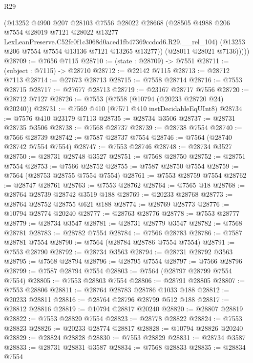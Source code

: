 \begin{lexlean}{R29}
\begin{coremodule}
            (@13252
              @4990
              @207
              @28103
              @7556
              @28022
              @28668
              (@28505
                @4988
                @206
                @7554
                @28019
                @7121
                @28022
                @13277
                LexLeanPreserve.C52fc0f1c3068d0aced1fb47369ccdcd6.R29.__rel_104)
              (@13253 @206 @7554 @7554 @13136 @7121 @13265 @13277))
            (@28011 @28021 @7136)))))
@28709 := @7656 @7115
@28710 := (state : @28709) -> @7551
@28711 := (subject : @7115) -> @28710
@28712 := @22142 @7115
@28713 := @28712 @7113
@28714 := @27673 @28713
@28715 := @7558 @28714
@28716 := @7553 @28715
@28717 := @27677 @28713
@28719 := @23167 @28717 @7556
@28720 := @28712 @7127
@28726 := @7553 (@7558 (@10794 (@20233 @28720 @24) @20240))
@28731 := @7569 @410 (@7571 @410 instDecidableEqUInt8)
@28734 := @7576 @410 @23179 @7113
@28735 := @28734 @3506
@28737 := @28731 @28735 @3506
@28738 := @7568 @28737
@28739 := @28738 @7554
@28740 := @7566 @28739
@28742 := @7587 @28737 @7554
@28746 := @7564 (@28740 @28742 @7554 @7554)
@28747 := @7553 @28746
@28748 := @28734 @3527
@28750 := @28731 @28748 @3527
@28751 := @7568 @28750
@28752 := @28751 @7554
@28753 := @7566 @28752
@28755 := @7587 @28750 @7554
@28759 := @7564 (@28753 @28755 @7554 @7554)
@28761 := @7553 @28759 @7554
@28762 := @28747 @28761
@28763 := @7553 @28762
@28764 := @7565 @18
@28768 := @28764 @28739 @28742 @3519 @188
@28769 := @20233 @28768
@28773 := @28764 @28752 @28755 @621 @188
@28774 := @28769 @28773
@28776 := @10794 @28774 @20240
@28777 := @28763 @28776
@28778 := @7553 @28777
@28779 := @28734 @3547
@28781 := @28731 @28779 @3547
@28782 := @7568 @28781
@28783 := @28782 @7554
@28784 := @7566 @28783
@28786 := @7587 @28781 @7554
@28790 := @7564 (@28784 @28786 @7554 @7554)
@28791 := @7553 @28790
@28792 := @28734 @3563
@28794 := @28731 @28792 @3563
@28795 := @7568 @28794
@28796 := @28795 @7554
@28797 := @7566 @28796
@28799 := @7587 @28794 @7554
@28803 := @7564 (@28797 @28799 @7554 @7554)
@28805 := @7553 @28803 @7554
@28806 := @28791 @28805
@28807 := @7553 @28806
@28811 := @28764 @28783 @28786 @1033 @188
@28812 := @20233 @28811
@28816 := @28764 @28796 @28799 @512 @188
@28817 := @28812 @28816
@28819 := @10794 @28817 @20240
@28820 := @28807 @28819
@28822 := @7553 @28820 @7554
@28823 := @28778 @28822
@28824 := @7553 @28823
@28826 := @20233 @28774 @28817
@28828 := @10794 @28826 @20240
@28829 := @28824 @28828
@28830 := @7553 @28829
@28831 := @28734 @3587
@28833 := @28731 @28831 @3587
@28834 := @7568 @28833
@28835 := @28834 @7554

\end{coremodule}
\end{lexlean}
